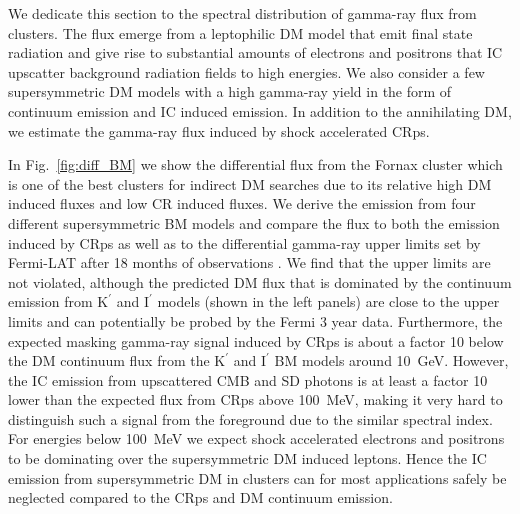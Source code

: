 \documentclass[10pt,aps,pra,reprint,amsmath,amsfonts,amssymb,showpacs]{revtex4-1}
\newcommand{\rmn}{\mathrm}
\newcommand{\Kp}{\rmn{K}^\prime}
\newcommand{\Ip}{\rmn{I}^\prime}
\begin{document}
We dedicate this section to the spectral distribution of gamma-ray
flux from clusters. The flux emerge from a leptophilic DM model that
emit final state radiation and give rise to substantial amounts of
electrons and positrons that IC upscatter background radiation fields
to high energies. We also consider a few supersymmetric DM models with
a high gamma-ray yield in the form of continuum emission and IC
induced emission. In addition to the annihilating DM, we estimate the
gamma-ray flux induced by shock accelerated CRps.

In Fig.~\ref{fig:diff_BM} we show the differential flux from the
Fornax cluster which is one of the best clusters for indirect DM
searches due to its relative high DM induced fluxes and low CR induced
fluxes. We derive the emission from four different supersymmetric BM
models and compare the flux to both the emission induced by CRps as
well as to the differential gamma-ray upper limits set by Fermi-LAT
after 18 months of observations \cite{2010ApJ...717L..71A}. We find
that the upper limits are not violated, although the predicted DM flux
that is dominated by the continuum emission from $\Kp$ and $\Ip$
models (shown in the left panels) are close to the upper limits and
can potentially be probed by the Fermi 3 year data. Furthermore, the
expected masking gamma-ray signal induced by CRps is about a factor 10
below the DM continuum flux from the $\Kp$ and $\Ip$ BM models around
10~GeV. However, the IC emission from upscattered CMB and SD photons
is at least a factor 10 lower than the expected flux from CRps above
100~MeV, making it very hard to distinguish such a signal from the
foreground due to the similar spectral index. For energies below
100~MeV we expect shock accelerated electrons and positrons to be
dominating \cite{2010MNRAS.409..449P} over the supersymmetric DM
induced leptons. Hence the IC emission from supersymmetric DM in
clusters can for most applications safely be neglected compared to the
CRps and DM continuum emission.
\end{document}
